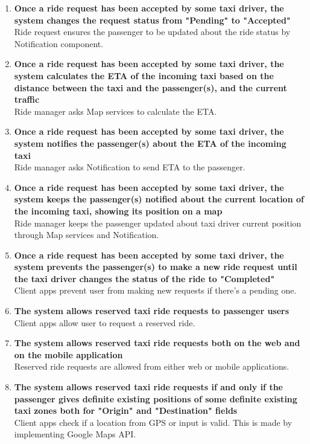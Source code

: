 \begin{enumerate}
	\item \textbf{Once a ride request has been accepted by some taxi driver, the system changes the request status from "Pending" to "Accepted"}\\
	Ride request ensures the passenger to be updated about the ride status by Notification component.
	
	\item \textbf{Once a ride request has been accepted by some taxi driver, the system calculates the ETA of the incoming taxi based on the distance between the taxi and the passenger(s), and the current traffic}\\
	Ride manager asks Map services to calculate the ETA.
	
	\item \textbf{Once a ride request has been accepted by some taxi driver, the system notifies the passenger(s) about the ETA of the incoming taxi}\\
	Ride manager asks Notification to send ETA to the passenger.
	
	\item \textbf{Once a ride request has been accepted by some taxi driver, the system keeps the passenger(s) notified about the current location of the incoming taxi, showing its position on a map}\\
	Ride manager keeps the passenger updated about taxi driver current position through Map services and Notification.
	
	\item \textbf{Once a ride request has been accepted by some taxi driver, the system prevents the passenger(s) to make a new ride request until the taxi driver changes the status of the ride to "Completed"}\\
	Client apps prevent user from making new requests if there's a pending one. 
	
	\item \textbf{The system allows reserved taxi ride requests to passenger users}\\
	Client apps allow user to request a reserved ride.
	
	\item \textbf{The system allows reserved taxi ride requests both on the web and on the mobile application}\\
	Reserved ride requests are allowed from either web or mobile applications.
	
	\item \textbf{The system allows reserved taxi ride requests if and only if the passenger gives definite existing positions of some definite existing taxi zones both for "Origin" and "Destination" fields}\\
	Client apps check if a location from GPS or input is valid. This is made by implementing Google Maps API.
	

\end{enumerate}
